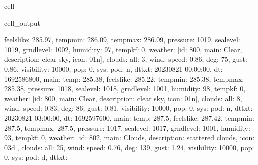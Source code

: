 \documentclass[letterpaper,10pt,english]{jupyterBook}
\begin{document}
\begin{sphinxuseclass}{cell}
\begin{sphinxVerbatimOutput}
\begin{sphinxuseclass}{cell_output}
\begin{sphinxVerbatim}[commandchars=\\\{\}]
\PYGZsq{}feels\PYGZus{}like\PYGZsq{}: 285.97, \PYGZsq{}temp\PYGZus{}min\PYGZsq{}: 286.09, \PYGZsq{}temp\PYGZus{}max\PYGZsq{}: 286.09, \PYGZsq{}pressure\PYGZsq{}: 1019, \PYGZsq{}sea\PYGZus{}level\PYGZsq{}: 1019, \PYGZsq{}grnd\PYGZus{}level\PYGZsq{}: 1002, \PYGZsq{}humidity\PYGZsq{}: 97, \PYGZsq{}temp\PYGZus{}kf\PYGZsq{}: 0\PYGZcb{}, \PYGZsq{}weather\PYGZsq{}: [\PYGZob{}\PYGZsq{}id\PYGZsq{}: 800, \PYGZsq{}main\PYGZsq{}: \PYGZsq{}Clear\PYGZsq{}, \PYGZsq{}description\PYGZsq{}: \PYGZsq{}clear sky\PYGZsq{}, \PYGZsq{}icon\PYGZsq{}: \PYGZsq{}01n\PYGZsq{}\PYGZcb{}], \PYGZsq{}clouds\PYGZsq{}: \PYGZob{}\PYGZsq{}all\PYGZsq{}: 3\PYGZcb{}, \PYGZsq{}wind\PYGZsq{}: \PYGZob{}\PYGZsq{}speed\PYGZsq{}: 0.86, \PYGZsq{}deg\PYGZsq{}: 75, \PYGZsq{}gust\PYGZsq{}: 0.86\PYGZcb{}, \PYGZsq{}visibility\PYGZsq{}: 10000, \PYGZsq{}pop\PYGZsq{}: 0, \PYGZsq{}sys\PYGZsq{}: \PYGZob{}\PYGZsq{}pod\PYGZsq{}: \PYGZsq{}n\PYGZsq{}\PYGZcb{}, \PYGZsq{}dt\PYGZus{}txt\PYGZsq{}: \PYGZsq{}2023\PYGZhy{}08\PYGZhy{}21 00:00:00\PYGZsq{}\PYGZcb{}, \PYGZob{}\PYGZsq{}dt\PYGZsq{}: 1692586800, \PYGZsq{}main\PYGZsq{}: \PYGZob{}\PYGZsq{}temp\PYGZsq{}: 285.38, \PYGZsq{}feels\PYGZus{}like\PYGZsq{}: 285.22, \PYGZsq{}temp\PYGZus{}min\PYGZsq{}: 285.38, \PYGZsq{}temp\PYGZus{}max\PYGZsq{}: 285.38, \PYGZsq{}pressure\PYGZsq{}: 1018, \PYGZsq{}sea\PYGZus{}level\PYGZsq{}: 1018, \PYGZsq{}grnd\PYGZus{}level\PYGZsq{}: 1001, \PYGZsq{}humidity\PYGZsq{}: 98, \PYGZsq{}temp\PYGZus{}kf\PYGZsq{}: 0\PYGZcb{}, \PYGZsq{}weather\PYGZsq{}: [\PYGZob{}\PYGZsq{}id\PYGZsq{}: 800, \PYGZsq{}main\PYGZsq{}: \PYGZsq{}Clear\PYGZsq{}, \PYGZsq{}description\PYGZsq{}: \PYGZsq{}clear sky\PYGZsq{}, \PYGZsq{}icon\PYGZsq{}: \PYGZsq{}01n\PYGZsq{}\PYGZcb{}], \PYGZsq{}clouds\PYGZsq{}: \PYGZob{}\PYGZsq{}all\PYGZsq{}: 8\PYGZcb{}, \PYGZsq{}wind\PYGZsq{}: \PYGZob{}\PYGZsq{}speed\PYGZsq{}: 0.83, \PYGZsq{}deg\PYGZsq{}: 86, \PYGZsq{}gust\PYGZsq{}: 0.81\PYGZcb{}, \PYGZsq{}visibility\PYGZsq{}: 10000, \PYGZsq{}pop\PYGZsq{}: 0, \PYGZsq{}sys\PYGZsq{}: \PYGZob{}\PYGZsq{}pod\PYGZsq{}: \PYGZsq{}n\PYGZsq{}\PYGZcb{}, \PYGZsq{}dt\PYGZus{}txt\PYGZsq{}: \PYGZsq{}2023\PYGZhy{}08\PYGZhy{}21 03:00:00\PYGZsq{}\PYGZcb{}, \PYGZob{}\PYGZsq{}dt\PYGZsq{}: 1692597600, \PYGZsq{}main\PYGZsq{}: \PYGZob{}\PYGZsq{}temp\PYGZsq{}: 287.5, \PYGZsq{}feels\PYGZus{}like\PYGZsq{}: 287.42, \PYGZsq{}temp\PYGZus{}min\PYGZsq{}: 287.5, \PYGZsq{}temp\PYGZus{}max\PYGZsq{}: 287.5, \PYGZsq{}pressure\PYGZsq{}: 1017, \PYGZsq{}sea\PYGZus{}level\PYGZsq{}: 1017, \PYGZsq{}grnd\PYGZus{}level\PYGZsq{}: 1001, \PYGZsq{}humidity\PYGZsq{}: 93, \PYGZsq{}temp\PYGZus{}kf\PYGZsq{}: 0\PYGZcb{}, \PYGZsq{}weather\PYGZsq{}: [\PYGZob{}\PYGZsq{}id\PYGZsq{}: 802, \PYGZsq{}main\PYGZsq{}: \PYGZsq{}Clouds\PYGZsq{}, \PYGZsq{}description\PYGZsq{}: \PYGZsq{}scattered clouds\PYGZsq{}, \PYGZsq{}icon\PYGZsq{}: \PYGZsq{}03d\PYGZsq{}\PYGZcb{}], \PYGZsq{}clouds\PYGZsq{}: \PYGZob{}\PYGZsq{}all\PYGZsq{}: 25\PYGZcb{}, \PYGZsq{}wind\PYGZsq{}: \PYGZob{}\PYGZsq{}speed\PYGZsq{}: 0.76, \PYGZsq{}deg\PYGZsq{}: 139, \PYGZsq{}gust\PYGZsq{}: 1.24\PYGZcb{}, \PYGZsq{}visibility\PYGZsq{}: 10000, \PYGZsq{}pop\PYGZsq{}: 0, \PYGZsq{}sys\PYGZsq{}: \PYGZob{}\PYGZsq{}pod\PYGZsq{}: \PYGZsq{}d\PYGZsq{}\PYGZcb{}, \PYGZsq{}dt\PYGZus{}txt\PYGZsq{}: 
\end{sphinxVerbatim}
\end{sphinxuseclass}
\end{sphinxVerbatimOutput}
\end{sphinxuseclass}
\end{document}

